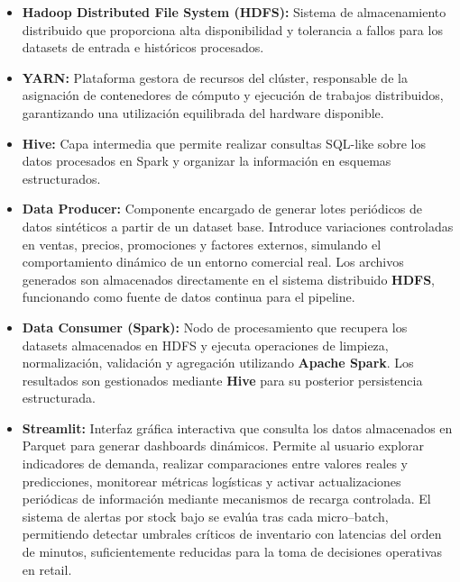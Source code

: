 \documentclass[12pt,a4paper]{article}
\begin{document}
	\begin{itemize}
		
		\item \textbf{Hadoop Distributed File System (HDFS):}
		Sistema de almacenamiento distribuido que proporciona alta disponibilidad y tolerancia a fallos para los datasets de entrada e históricos procesados.
		
		\item \textbf{YARN:}
		Plataforma gestora de recursos del clúster, responsable de la asignación de contenedores de cómputo y ejecución de trabajos distribuidos, garantizando una utilización equilibrada del hardware disponible.
		
		\item \textbf{Hive:}
		Capa intermedia que permite realizar consultas SQL-like sobre los datos procesados en Spark y organizar la información en esquemas estructurados.
		
		\item \textbf{Data Producer:}
		Componente encargado de generar lotes periódicos de datos sintéticos a partir de un dataset base. Introduce variaciones controladas en ventas, precios, promociones y factores externos, simulando el comportamiento dinámico de un entorno comercial real. Los archivos generados son almacenados directamente en el sistema distribuido \textbf{HDFS}, funcionando como fuente de datos continua para el pipeline.
		
		\item \textbf{Data Consumer (Spark):}
		Nodo de procesamiento que recupera los datasets almacenados en HDFS y ejecuta operaciones de limpieza, normalización, validación y agregación utilizando \textbf{Apache Spark}. Los resultados son gestionados mediante \textbf{Hive} para su posterior persistencia estructurada.
		
		\item \textbf{Streamlit:}
		Interfaz gráfica interactiva que consulta los datos almacenados en Parquet para generar dashboards dinámicos. Permite al usuario explorar indicadores de demanda, realizar comparaciones entre valores reales y predicciones, monitorear métricas logísticas y activar actualizaciones periódicas de información mediante mecanismos de recarga controlada. El sistema de alertas por stock bajo se evalúa tras cada micro–batch, permitiendo detectar umbrales críticos de inventario con latencias del orden de minutos, suficientemente reducidas para la toma de decisiones operativas en retail.
		
		
	\end{itemize}
	
\end{document}
